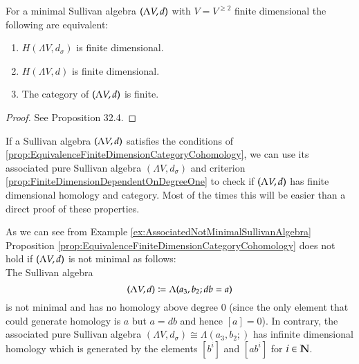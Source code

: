  
 \begin{Proposition}
\label{prop:EquivalenceFiniteDimensionCategoryCohomology}
 For a minimal Sullivan algebra $(\Lambda V,d)$ with $V = V^{\geq 2}$ finite dimensional the following
 are equivalent:
 
 \begin{enumerate}
  \item $H(\Lambda V, d_{\sigma})$ is finite dimensional.
  \item $H(\Lambda V, d)$ is finite dimensional.
  \item The category of $(\Lambda V,d)$ is finite.
 \end{enumerate}

\end{Proposition}

\begin{proof}
 See \cite{Felix2001} Proposition 32.4.
\end{proof}

If a Sullivan algebra $(\Lambda V,d)$ satisfies the conditions of \ref{prop:EquivalenceFiniteDimensionCategoryCohomology},
we can use its associated pure Sullivan algebra $(\Lambda V, d_{\sigma})$ and criterion \ref{prop:FiniteDimensionDependentOnDegreeOne}
to check if $(\Lambda V,d)$ has finite dimensional homology and category. Most of the times this will be easier than 
a direct proof of these properties.

\begin{Remark}
 As we can see from Example \ref{ex:AssociatedNotMinimalSullivanAlgebra} Proposition 
 \ref{prop:EquivalenceFiniteDimensionCategoryCohomology} does not hold if $(\Lambda V,d)$ is not minimal as follows: \\
 The Sullivan algebra $$(\Lambda V,d) \coloneqq \Lambda( a_3, b_2 ; db = a)$$ is not minimal and 
 has no homology above degree $0$ (since
 the only element that could generate homology is $a$ but $a = db$ and hence $[a] = 0$). In contrary, the associated
 pure Sullivan algebra $ (\Lambda V, d_{\sigma}) \cong \Lambda (a_3, b_2 ;)$ has infinite dimensional homology which is 
 generated by the elements
 $[b^i]$ and $[ab^i]$ for $i \in \mathbb{N}$.
\end{Remark}
